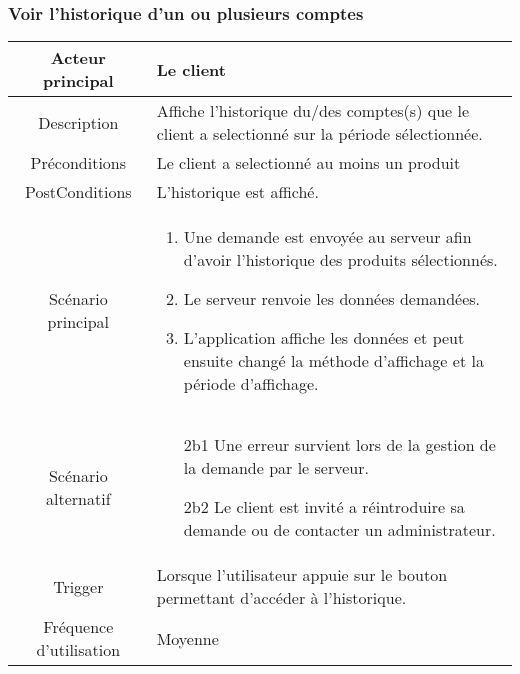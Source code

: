 \documentclass{article}
\begin{document}
\subsubsection{Voir l'historique d'un ou plusieurs comptes}
\begin{table}[h]
      \begin{tabular}{|c|p{10cm}|}
         \hline
         Acteur principal&Le client\\
         \hline
         Description&Affiche l'historique du/des comptes(s) que le client a selectionné sur la période sélectionnée.\\
         \hline
         Préconditions&Le client a selectionné au moins un produit\\
         \hline
         PostConditions&L'historique est affiché.\\
         \hline
         Scénario principal& 
               \begin{enumerate}
                  \item Une demande est envoyée au serveur afin d'avoir l'historique des produits sélectionnés.
                  \item Le serveur renvoie les données demandées.
                  \item L'application affiche les données et peut ensuite changé la méthode d'affichage et la période d'affichage.
               \end{enumerate}     \\
         \hline
         Scénario alternatif&
               \begin{itemize}
                  \item[2b1] Une erreur survient lors de la gestion de la demande par le serveur.
                  \item[2b2] Le client est invité a réintroduire sa demande ou de contacter un administrateur.  
               \end{itemize} \\
         \hline
         Trigger&Lorsque l'utilisateur appuie sur le bouton permettant d'accéder à l'historique.\\
         \hline
         Fréquence d'utilisation&Moyenne\\
         \hline
      \end{tabular}
\end{table}

\newpage
\end{document}
